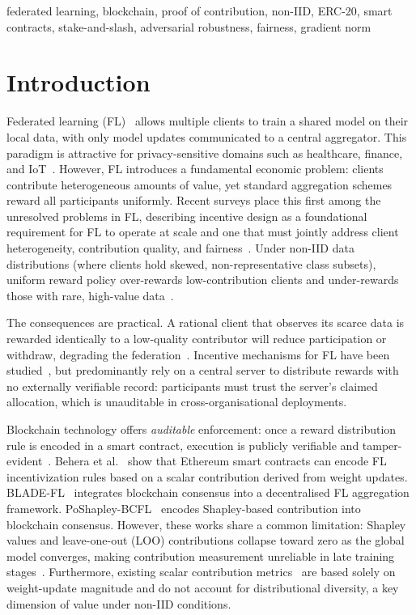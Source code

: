 \documentclass[conference]{IEEEtran}
\theoremstyle{remark}
\begin{document}
\begin{IEEEkeywords}
federated learning, blockchain, proof of contribution, non-IID, ERC-20,
smart contracts, stake-and-slash, adversarial robustness, fairness, gradient norm
\end{IEEEkeywords}

\section{Introduction}

Federated learning (FL)~\cite{mcmahan2017communication} allows multiple
clients to train a shared model on their local data, with only model
updates communicated to a central aggregator. This paradigm is
attractive for privacy-sensitive domains such as healthcare, finance,
and IoT~\cite{nguyen2021federated}. However, FL introduces a fundamental
economic problem: clients contribute heterogeneous amounts of value, yet
standard aggregation schemes reward all participants uniformly.
Recent surveys place this first among the unresolved problems in FL,
describing incentive design as a foundational requirement for FL to
operate at scale and one that must jointly address client
heterogeneity, contribution quality, and
fairness~\cite{ziaeinejad2026context, zhu2023blockchain}. Under
non-IID data distributions (where clients hold skewed, non-representative
class subsets), uniform reward policy over-rewards low-contribution
clients and under-rewards those with rare, high-value
data~\cite{zhan2021incentive, zhao2018federated}.

The consequences are practical. A rational client that observes its
scarce data is rewarded identically to a low-quality contributor will
reduce participation or withdraw, degrading the
federation~\cite{song2019profit}. Incentive mechanisms for FL have been
studied~\cite{wang2020measure, gradient_driven_fairness2021}, but
predominantly rely on a central server to distribute rewards with no
externally verifiable record: participants must trust the server's
claimed allocation, which is unauditable in cross-organisational
deployments.

Blockchain technology offers \emph{auditable} enforcement: once a reward
distribution rule is encoded in a smart contract, execution is publicly
verifiable and tamper-evident~\cite{buterin2014ethereum}.
Behera et al.~\cite{behera2021federated} show that Ethereum smart
contracts can encode FL incentivization rules based on a scalar
contribution derived from weight updates. BLADE-FL~\cite{bladefl2022}
integrates blockchain consensus into a decentralised FL aggregation
framework. PoShapley-BCFL~\cite{poshapley2023} encodes Shapley-based
contribution into blockchain consensus. However, these works share a
common limitation: Shapley values and leave-one-out (LOO) contributions
collapse toward zero as the global model converges, making contribution
measurement unreliable in late training stages~\cite{poshapley2023}.
Furthermore, existing scalar contribution
metrics~\cite{behera2021federated} are based solely on weight-update
magnitude and do not account for distributional diversity, a key
dimension of value under non-IID conditions.
\end{document}
